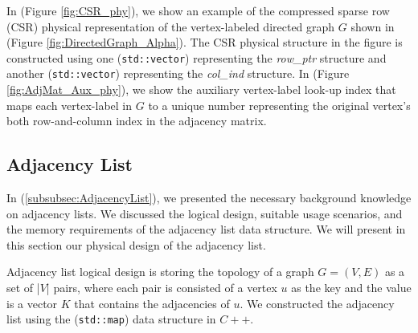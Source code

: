 {%

In (Figure \ref{fig:CSR_phy}), we show an example of the compressed sparse row (CSR) physical representation of the vertex-labeled directed graph $G$ shown in (Figure \ref{fig:DirectedGraph_Alpha}). The CSR physical structure in the figure is constructed using one (\texttt{std::vector}) representing the \textit{row\_ptr} structure and another (\texttt{std::vector}) representing the \textit{col\_ind} structure. In (Figure \ref{fig:AdjMat_Aux_phy}), we show the auxiliary vertex-label look-up index that maps each vertex-label in $G$ to a unique number representing the original vertex's both row-and-column index in the adjacency matrix.


\subsection{Adjacency List}
\label{subsec:PhyDesign-AdjacencyList}

In (\ref{subsubsec:AdjacencyList}), we presented the necessary background knowledge on adjacency lists. We discussed the logical design, suitable usage scenarios, and the memory requirements of the adjacency list data structure. We will present in this section our physical design of the adjacency list.


Adjacency list logical design is storing the topology of a graph $G = (V,E)$ as a set of |$V$| pairs, where each pair is consisted of a vertex $u$ as the key and the value is a vector $K$ that contains the adjacencies of $u$. We constructed the adjacency list using the (\texttt{std::map}) data structure in $C++$.

}
